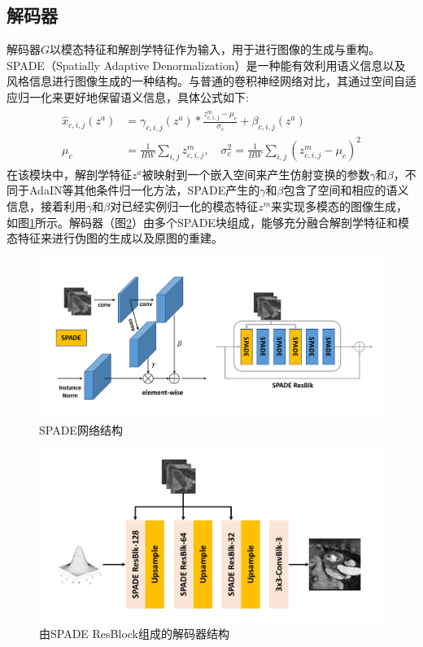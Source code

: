 \subsection{解码器}
解码器$G$以模态特征和解剖学特征作为输入，用于进行图像的生成与重构。SPADE\cite{park2019semantic}（Spatially Adaptive Denormalization）是一种能有效利用语义信息以及风格信息进行图像生成的一种结构。与普通的卷积神经网络对比，其通过空间自适应归一化来更好地保留语义信息，具体公式如下:
\begin{align}
    \begin{split}
    \hat{x}_{c,i,j}(z^a) &=\gamma_{c,i,j}(z^a) * \frac{z^m_{c,i,j}-\mu_{c}}{\sigma_{c}}+\beta_{c,i,j}(z^a) \\
    \mu_{c} &=\frac{1}{H W} \sum_{i, j} z^m_{c,i,j},\quad \sigma_{c}^{2}=\frac{1}{H W} \sum_{i, j}\left(z^m_{c,i,j}-\mu_{c}\right)^{2}
    \end{split}
\end{align}
在该模块中，解剖学特征$z^a$被映射到一个嵌入空间来产生仿射变换的参数$\gamma$和$\beta$，不同于AdaIN等其他条件归一化方法，SPADE产生的$\gamma$和$\beta$包含了空间和相应的语义信息，接着利用$\gamma$和$\beta$对已经实例归一化的模态特征$z^m$来实现多模态的图像生成\cite{park2019semantic}，如图\ref{fig:spade}所示。解码器（图\ref{fig:decoder}）由多个SPADE块组成，能够充分融合解剖学特征和模态特征来进行伪图的生成以及原图的重建。
\begin{figure}
    \centering
    \includegraphics[width=\textwidth]{image/chap03/SPADE.pdf}
    \caption{SPADE网络结构}
    \label{fig:spade}
\end{figure}
\begin{figure}
    \centering
    \includegraphics[width=\textwidth]{image/chap03/decoder.pdf}
    \caption{由SPADE ResBlock组成的解码器结构}
    \label{fig:decoder}
\end{figure}

